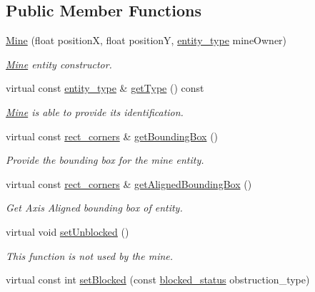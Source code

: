 \subsection*{Public Member Functions}
\begin{DoxyCompactItemize}
\item 
\hyperlink{classMine_ae3d52389f68d1f458e6240a44cbfd85a}{Mine} (float position\-X, float position\-Y, \hyperlink{Structures_8h_a6d8f83e710b27d4f86c45f0bb77066e3}{entity\-\_\-type} mine\-Owner)
\begin{DoxyCompactList}\small\item\em \hyperlink{classMine}{Mine} entity constructor. \end{DoxyCompactList}\item 
virtual const \hyperlink{Structures_8h_a6d8f83e710b27d4f86c45f0bb77066e3}{entity\-\_\-type} \& \hyperlink{classMine_af435cf100fe7f89e998ec2f7ad40faa1}{get\-Type} () const 
\begin{DoxyCompactList}\small\item\em \hyperlink{classMine}{Mine} is able to provide its identification. \end{DoxyCompactList}\item 
virtual const \hyperlink{structrect__corners}{rect\-\_\-corners} \& \hyperlink{classMine_a36b2ba160a413d45c9743447f075e99e}{get\-Bounding\-Box} ()
\begin{DoxyCompactList}\small\item\em Provide the bounding box for the mine entity. \end{DoxyCompactList}\item 
virtual const \hyperlink{structrect__corners}{rect\-\_\-corners} \& \hyperlink{classMine_a94667c68518d45d9c841501924a83612}{get\-Aligned\-Bounding\-Box} ()
\begin{DoxyCompactList}\small\item\em Get Axis Aligned bounding box of entity. \end{DoxyCompactList}\item 
virtual void \hyperlink{classMine_a859fd28c2c57a37b22ec3b88806f1134}{set\-Unblocked} ()
\begin{DoxyCompactList}\small\item\em This function is not used by the mine. \end{DoxyCompactList}\item 
virtual const int \hyperlink{classMine_acf2add61f1763222f0d1a7333d2b0633}{set\-Blocked} (const \hyperlink{Structures_8h_a6fef29d9424addfa69bdd2a379424896}{blocked\-\_\-status} obstruction\-\_\-type)

\end{DoxyCompactItemize}
